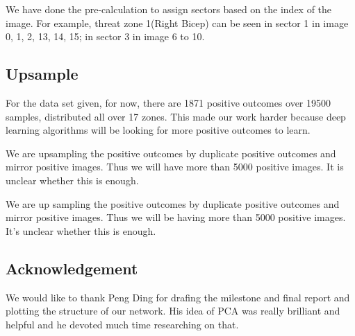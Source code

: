 \documentclass[conference,compsoc]{IEEEtran}
\begin{document}
We have done the pre-calculation to assign sectors based on the index of the image. For example, threat zone 1(Right Bicep) can be seen in sector 1 in image 0, 1, 2, 13, 14, 15; in sector 3 in image 6 to 10.

\subsection{Upsample}
For the data set given, for now, there are 1871 positive outcomes over 19500 samples, distributed all over 17 zones. This made our work harder because deep learning algorithms will be looking for more positive outcomes to learn.

We are upsampling the positive outcomes by duplicate positive outcomes and mirror positive images. Thus we will have more than 5000 positive images. It is unclear whether this is enough.

We are up sampling the positive outcomes by duplicate positive outcomes and mirror positive images. Thus we will be having more than 5000 positive images. It's unclear whether this is enough.

\subsection{Acknowledgement}
\par We would like to thank Peng Ding for drafing the milestone and final report and plotting the structure of our network. His idea of PCA was really brilliant and helpful and he devoted much time researching on that.



\end{document}
